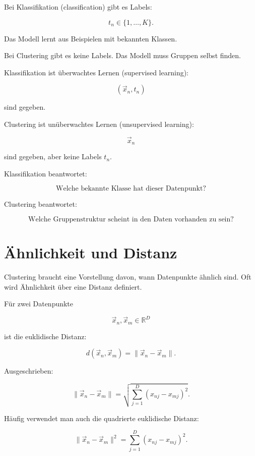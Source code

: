 Bei Klassifikation (classification) gibt es Labels:

\[
    t_n \in \{1,\dots,K\}.
\]

Das Modell lernt aus Beispielen mit bekannten Klassen.

Bei Clustering gibt es keine Labels.
Das Modell muss Gruppen selbst finden.

\begin{definitionbox}
Klassifikation ist überwachtes Lernen (supervised learning):

\[
    (\vec{x}_n,t_n)
\]

sind gegeben.

Clustering ist unüberwachtes Lernen (unsupervised learning):

\[
    \vec{x}_n
\]

sind gegeben, aber keine Labels \(t_n\).
\end{definitionbox}

\begin{conceptbox}
Klassifikation beantwortet:

\[
    \text{Welche bekannte Klasse hat dieser Datenpunkt?}
\]

Clustering beantwortet:

\[
    \text{Welche Gruppenstruktur scheint in den Daten vorhanden zu sein?}
\]
\end{conceptbox}

\section{Ähnlichkeit und Distanz}

Clustering braucht eine Vorstellung davon, wann Datenpunkte ähnlich sind.
Oft wird Ähnlichkeit über eine Distanz definiert.

Für zwei Datenpunkte

\[
    \vec{x}_n,\vec{x}_m\in\mathbb{R}^D
\]

ist die euklidische Distanz:

\[
    d(\vec{x}_n,\vec{x}_m)
    =
    \|\vec{x}_n-\vec{x}_m\|.
\]

Ausgeschrieben:

\[
    \|\vec{x}_n-\vec{x}_m\|
    =
    \sqrt{
        \sum_{j=1}^{D}
        (x_{nj}-x_{mj})^2
    }.
\]

Häufig verwendet man auch die quadrierte euklidische Distanz:

\[
    \|\vec{x}_n-\vec{x}_m\|^2
    =
    \sum_{j=1}^{D}
    (x_{nj}-x_{mj})^2.
\]

